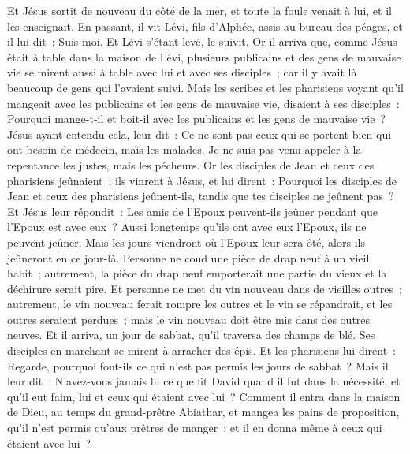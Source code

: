 \begin{multicols}{2}
Et Jésus sortit de nouveau du côté de la mer, et toute la foule venait à lui, et il les enseignait.
En passant, il vit Lévi, fils d'Alphée, assis au bureau des péages, et il lui dit~: Suis-moi. Et Lévi s'étant levé, le suivit.
Or il arriva que, comme Jésus était à table dans la maison de Lévi, plusieurs publicains et des gens de mauvaise vie se mirent aussi à table avec lui et avec ses disciples~; car il y avait là beaucoup de gens qui l'avaient suivi.
Mais les scribes et les pharisiens voyant qu'il mangeait avec les publicains et les gens de mauvaise vie, disaient à ses disciples~: Pourquoi mange-t-il et boit-il avec les publicains et les gens de mauvaise vie~?
Jésus ayant entendu cela, leur dit~: Ce ne sont pas ceux qui se portent bien qui ont besoin de médecin, mais les malades. Je ne suis pas venu appeler à la repentance les justes, mais les pécheurs.
Or les disciples de Jean et ceux des pharisiens jeûnaient~; ils vinrent à Jésus, et lui dirent~: Pourquoi les disciples de Jean et ceux des pharisiens jeûnent-ils, tandis que tes disciples ne jeûnent pas~?
Et Jésus leur répondit~: Les amis de l'Epoux peuvent-ils jeûner pendant que l'Epoux est avec eux~? Aussi longtemps qu'ils ont avec eux l'Epoux, ils ne peuvent jeûner.
Mais les jours viendront où l'Epoux leur sera ôté, alors ils jeûneront en ce jour-là.
Personne ne coud une pièce de drap neuf à un vieil habit~; autrement, la pièce du drap neuf emporterait une partie du vieux et la déchirure serait pire.
Et personne ne met du vin nouveau dans de vieilles outres~; autrement, le vin nouveau ferait rompre les outres et le vin se répandrait, et les outres seraient perdues~; mais le vin nouveau doit être mis dans des outres neuves.
Et il arriva, un jour de sabbat, qu'il traversa des champs de blé. Ses disciples en marchant se mirent à arracher des épis.
Et les pharisiens lui dirent~: Regarde, pourquoi font-ils ce qui n'est pas permis les jours de sabbat~?
Mais il leur dit~: N'avez-vous jamais lu ce que fit David quand il fut dans la nécessité, et qu'il eut faim, lui et ceux qui étaient avec lui~?
Comment il entra dans la maison de Dieu, au temps du grand-prêtre Abiathar, et mangea les pains de proposition, qu'il n'est permis qu'aux prêtres de manger~; et il en donna même à ceux qui étaient avec lui~?

\end{multicols}
